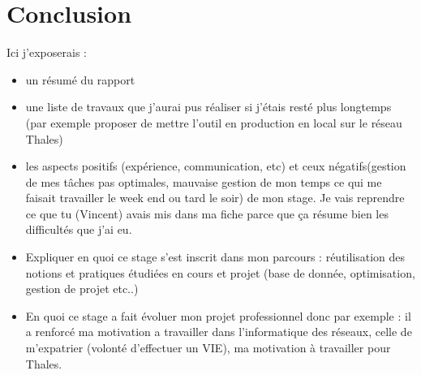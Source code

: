 \chapter*{Conclusion}



Ici j'exposerais : 
\begin{itemize}
\item un résumé du rapport
\item une liste de travaux que j'aurai pus réaliser si j'étais resté plus longtemps (par exemple proposer de mettre l'outil en production en local sur le réseau Thales)
\item les aspects positifs (expérience, communication, etc) et ceux négatifs(gestion de mes tâches pas optimales, mauvaise gestion de mon temps ce qui me faisait travailler le week end ou tard le soir) de mon stage. Je vais reprendre ce que tu (Vincent) avais mis dans ma fiche parce que ça résume bien les difficultés que j'ai eu.
\item Expliquer en quoi ce stage s'est inscrit dans mon parcours : réutilisation des notions et pratiques étudiées en cours et projet (base de donnée, optimisation, gestion de projet etc..)
\item En quoi ce stage a fait évoluer mon projet professionnel donc par exemple : il a renforcé ma motivation a travailler dans l'informatique des réseaux, celle de m'expatrier (volonté d'effectuer un VIE), ma motivation à travailler pour Thales.
\end{itemize}